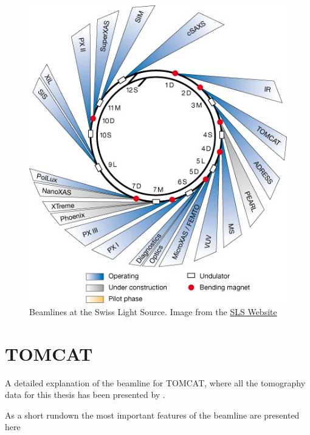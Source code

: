 \renewcommand{\imsize}{0.618\linewidth}%
\begin{figure}[htb]
	\centering
	\includegraphics[width=\imsize]{img/SLS_beamlines_2008}
	\caption{Beamlines at the Swiss Light Source. Image from the \href{http://sls.web.psi.ch/view.php/beamlines/}{SLS Website}}
	\label{fig:beamlines}
\end{figure}

\section{TOMCAT}
A detailed explanation of the beamline for \acf{TOMCAT}, where all the tomography data for this thesis has been presented by \citet{Stampanoni2006a}.

As a short rundown the most important features of the beamline are presented here 

